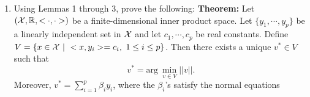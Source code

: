 \documentclass[letterpaper]{article}
\begin{document}
\begin{enumerate}
\begin{enumerate}
\textbf{Remark:} Another way of stating your result in (a) is that there exists a unique $x_0\in {\cal X}$ such that
$$V \cap \spanof{y_1, \cdots, y_p} = \{x_0 \}.$$


\item \textbf{Lemma 2:} Let $M= \left(\spanof{y_1, \cdots, y_p} \right)^\perp$. Then $V=x_0 + M$; in other words, $x\in V$ if, and only if, $(x-x_0) \perp \spanof{y_1, \cdots, y_p}.$

\item \textbf{Lemma 3:} There exists a unique $v^* \in V$ having minimum norm, and $v^*$ is characterized by $v^* \perp M$ (just for emphasis, we note that the result does not say that $v^* \perp V$).\\

  \textbf{Remark:} We note that $v^* \perp M$ $\Leftrightarrow$ $v^* \in \spanof{y_1, \cdots, y_p}$ because ${\cal X} = M \oplus M^\perp$ implies that
  $$ M^\perp := \left( \spanof{y_1, \cdots, y_p}^\perp \right)^\perp = \spanof{y_1, \cdots, y_p}$$

  \textbf{Remark:} We are using the standard induced norm, $||x|| = <x,x>^{1/2}$. \\

    \textbf{Remark:}  There exists $v^*$ having minimum norm means $||v^*|| = \inf_{v\in V} ||v||$,  and thus $$v^* = \mathrm{arg}~\min_{v\in V} ||v||.$$
\end{enumerate}

\newpage

\item  Using Lemmas 1 through 3, prove the following: \textbf{Theorem:} Let $({\cal X}, \mathbb R, <\cdot, \cdot>)$ be a finite-dimensional inner product space.  Let $\{y_1, \cdots, y_p \}$ be a linearly independent set in ${\cal X}$ and let $c_1, \cdots, c_p$ be real constants.  Define $ V=\{ x\in {\cal X}~|~ <x,y_i>=c_i,~1 \le i \le p\}$. Then there exists a unique $v^*\in V$ such that
     $$ v^* = \mathrm{arg}~\min_{v\in V} ||v||.$$
     Moreover, $v^* = \sum_{i=1}^{p} \beta_i y_i$, where the $\beta_i$'s satisfy the normal equations


\end{enumerate}
\end{document}
